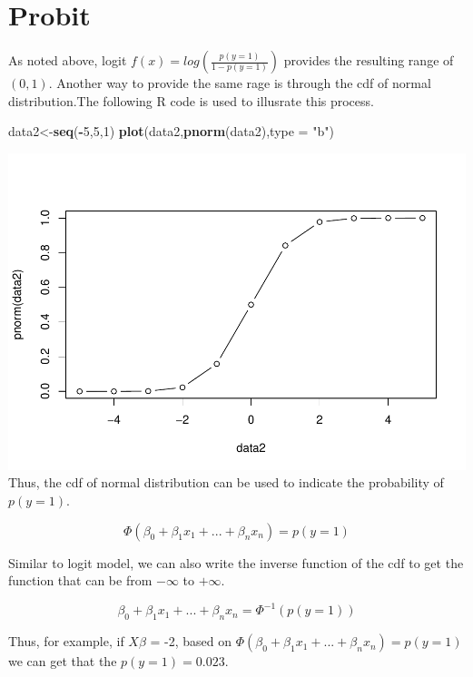 \documentclass[]{book}
\newenvironment{Shaded}{\begin{snugshade}}{\end{snugshade}}
\newcommand{\KeywordTok}[1]{\textcolor[rgb]{0.13,0.29,0.53}{\textbf{#1}}}
\newcommand{\DataTypeTok}[1]{\textcolor[rgb]{0.13,0.29,0.53}{#1}}
\newcommand{\DecValTok}[1]{\textcolor[rgb]{0.00,0.00,0.81}{#1}}
\newcommand{\StringTok}[1]{\textcolor[rgb]{0.31,0.60,0.02}{#1}}
\newcommand{\OperatorTok}[1]{\textcolor[rgb]{0.81,0.36,0.00}{\textbf{#1}}}
\newcommand{\NormalTok}[1]{#1}
\begin{document}
\section{Probit}\label{probit}

As noted above, logit \(f(x)=log(\frac{p(y=1)}{1-p(y=1)})\) provides the
resulting range of \((0,1)\). Another way to provide the same rage is
through the cdf of normal distribution.The following R code is used to
illusrate this process.

\begin{Shaded}
\begin{Highlighting}[]
\NormalTok{data2<-}\KeywordTok{seq}\NormalTok{(}\OperatorTok{-}\DecValTok{5}\NormalTok{,}\DecValTok{5}\NormalTok{,}\DecValTok{1}\NormalTok{)}
\KeywordTok{plot}\NormalTok{(data2,}\KeywordTok{pnorm}\NormalTok{(data2),}\DataTypeTok{type =} \StringTok{"b"}\NormalTok{)}
\end{Highlighting}
\end{Shaded}

\includegraphics{bookdown-demo_files/figure-latex/unnamed-chunk-3-1.pdf}
Thus, the cdf of normal distribution can be used to indicate the
probability of \(p(y=1)\).

\[\Phi(\beta_0+\beta_1x_1+...+\beta_nx_n )= p(y=1)\]

Similar to logit model, we can also write the inverse function of the
cdf to get the function that can be from \(-\infty\) to \(+\infty\).

\[\beta_0+\beta_1x_1+...+\beta_nx_n =\Phi^{-1}(p(y=1))\]

Thus, for example, if \(X\beta\) = -2, based on
\(\Phi(\beta_0+\beta_1x_1+...+\beta_nx_n )= p(y=1)\) we can get that the
\(p(y=1)=0.023\).
\end{document}
